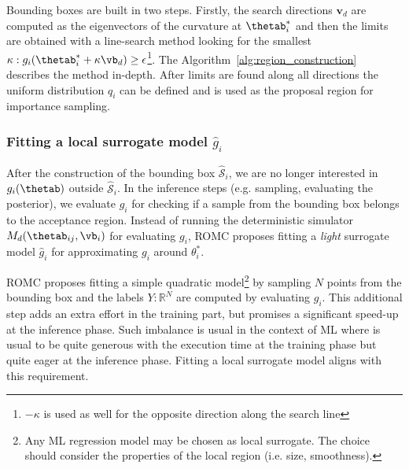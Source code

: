 Bounding boxes are built in two steps. Firstly, the search directions
$\mathbf{v}_d$ are computed as the eigenvectors of the curvature at
$\thetab_i^*$ and then the limits are obtained with a line-search
method looking for the smallest
$\kappa: g_i(\thetab_i^* + \kappa \vb_d) \geq
\epsilon$\footnote{$-\kappa$ is used as well for the opposite
  direction along the search line}. The
Algorithm~\ref{alg:region_construction} describes the method
in-depth. After limits are found along all directions the uniform
distribution $q_i$ can be defined and is used as the proposal region
for importance sampling.


\subsubsection*{Fitting a local surrogate model $\hat{g}_i$}

After the construction of the bounding box $\mathcal{\hat{S}}_i$, we
are no longer interested in $g_i(\thetab)$ outside
$\mathcal{\hat{S}}_i$. In the inference steps (e.g. sampling,
evaluating the posterior), we evaluate $g_i$ for checking if a sample
from the bounding box belongs to the acceptance region. Instead of
running the deterministic simulator $M_d(\thetab_{ij}, \vb_i)$ for
evaluating $g_i$, ROMC proposes fitting a \emph{light} surrogate model
$\hat{g}_i$ for approximating $g_i$ around $\theta_i^*$.

ROMC proposes fitting a simple quadratic model\footnote{Any ML
  regression model may be chosen as local surrogate. The choice should
  consider the properties of the local region (i.e. size,
  smoothness). } by sampling $N$ points from the bounding box and the
labels $Y: \mathbb{R}^{N}$ are computed by evaluating $g_i$. This
additional step adds an extra effort in the training part, but
promises a significant speed-up at the inference phase. Such imbalance
is usual in the context of ML where is usual to be quite generous with
the execution time at the training phase but quite eager at the
inference phase. Fitting a local surrogate model aligns with this
requirement.

